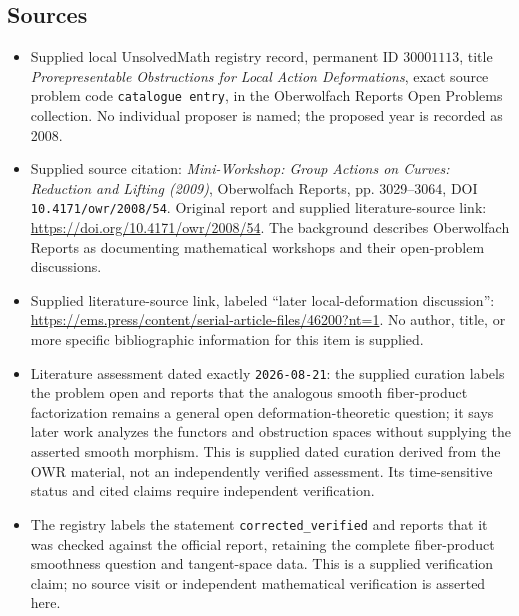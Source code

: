 \documentclass[11pt]{article}
\begin{document}
\subsection{Sources}
\begin{itemize}
\item Supplied local UnsolvedMath registry record, permanent ID \(30001113\), title \emph{Prorepresentable Obstructions for Local Action Deformations}, exact source problem code \texttt{catalogue entry}, in the Oberwolfach Reports Open Problems collection. No individual proposer is named; the proposed year is recorded as 2008.
\item Supplied source citation: \emph{Mini-Workshop: Group Actions on Curves: Reduction and Lifting (2009)}, Oberwolfach Reports, pp. 3029--3064, DOI \texttt{10.4171/owr/2008/54}. Original report and supplied literature-source link: \url{https://doi.org/10.4171/owr/2008/54}. The background describes Oberwolfach Reports as documenting mathematical workshops and their open-problem discussions.
\item Supplied literature-source link, labeled ``later local-deformation discussion'': \url{https://ems.press/content/serial-article-files/46200?nt=1}. No author, title, or more specific bibliographic information for this item is supplied.
\item Literature assessment dated exactly \texttt{2026-08-21}: the supplied curation labels the problem open and reports that the analogous smooth fiber-product factorization remains a general open deformation-theoretic question; it says later work analyzes the functors and obstruction spaces without supplying the asserted smooth morphism. This is supplied dated curation derived from the OWR material, not an independently verified assessment. Its time-sensitive status and cited claims require independent verification.
\item The registry labels the statement \texttt{corrected\_verified} and reports that it was checked against the official report, retaining the complete fiber-product smoothness question and tangent-space data. This is a supplied verification claim; no source visit or independent mathematical verification is asserted here.
\end{itemize}
\end{document}
